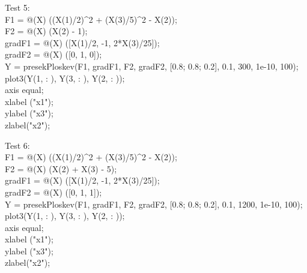 \documentclass[12pt, letterpaper, twoside]{article}    %
\begin{document}
\newpage

Test 5: \\
F1 = @(X) ((X(1)/2)\^{}2 + (X(3)/5)\^{}2 - X(2)); \\
F2 = @(X) (X(2) - 1); \\ 
gradF1 = @(X) ([X(1)/2, -1, 2*X(3)/25]); \\
gradF2 = @(X) ([0, 1, 0]); \\
Y = presekPloskev(F1, gradF1, F2, gradF2, [0.8; 0.8; 0.2], 0.1, 300, 1e-10, 100); \\
plot3(Y(1, : ), Y(3, : ), Y(2, : )); \\
axis equal; \\
xlabel ("x1"); \\
ylabel ("x3"); \\
zlabel("x2"); \\

$$$$

Test 6: \\
F1 = @(X) ((X(1)/2)\^{}2 + (X(3)/5)\^{}2 - X(2)); \\
F2 = @(X) (X(2) +  X(3) - 5); \\
gradF1 = @(X) ([X(1)/2, -1, 2*X(3)/25]); \\
gradF2 = @(X) ([0, 1, 1]); \\
Y = presekPloskev(F1, gradF1, F2, gradF2, [0.8; 0.8; 0.2], 0.1, 1200, 1e-10, 100); \\
plot3(Y(1, : ), Y(3, : ), Y(2, : )); \\
axis equal; \\
xlabel ("x1"); \\
ylabel ("x3"); \\
zlabel("x2"); \\

\newpage
\end{document}

